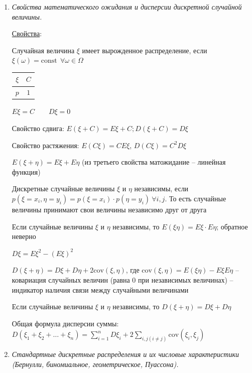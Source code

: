 \begin{enumerate}
    $m_k = E\xi^k$ -- момент $k$-ого порядка случайной величины $\xi$ (также называют начальным моментом)

    $\mu_k = E(\xi - E\xi)^k$ -- центральный момент $k$-ого порядка

    \item \textit{Свойства математического ожидания и дисперсии дискретной случайной величины.}

    \hyperlink{expectedvalueandvarianceproperties}{Свойства}: 

     Случайная величина $\xi$ имеет вырожденное распределение, если $\xi(\omega) = \mathrm{const} \ \ \forall \omega \in \Omega$

    \begin{tabular}{c|c}
        $\xi$ & $C$ \\
        \hline
        $p$   & $1$
    \end{tabular}

    $E\xi = C \qquad D\xi = 0$

     Свойство сдвига: $E(\xi + C) = E\xi + C; D (\xi + C) = D\xi$

     Свойство растяжения: $E(C\xi) = CE\xi$, $D(C\xi) = C^2 D\xi$

     $E(\xi + \eta) = E\xi + E\eta$ (из третьего свойства матожидание -- линейная функция)

    \Def Дискретные случайные величины $\xi$ и $\eta$ независимы, если $p(\xi = x_i, \eta = y_i) = p(\xi = x_i) \cdot p(\eta = y_i) \ \forall i, j$.
    То есть случайные величины принимают свои величины независимо друг от друга

     Если случайные величины $\xi$ и $\eta$ независимы, то $E(\xi \eta) = E\xi \cdot E\eta$; обратное неверно

     $D\xi = E\xi^2 - (E\xi)^2$

    \Def $D(\xi + \eta) = D\xi + D\eta + 2\mathrm{cov} (\xi, \eta)$,
    где $\mathrm{cov}(\xi, \eta) = E(\xi\eta) - E\xi E\eta$ -- ковариация случайных величин (равна 0 при независимых величинах) -- индикатор наличия связи между случайными величинами

     Если случайные величины $\xi$ и $\eta$ независимы, то $D(\xi + \eta) = D\xi + D\eta$

     Общая формула дисперсии суммы: $D(\xi_1 + \xi_2 + \dots + \xi_n) = \sum_{i = 1}^n D \xi_i + 2\sum_{i, j (i \neq j)} \mathrm{cov} (\xi_i, \xi_j)$

    \item \textit{Стандартные дискретные распределения и их числовые характеристики (Бернулли, биномиальное, геометрическое, Пуассона).}
    

\end{enumerate}
